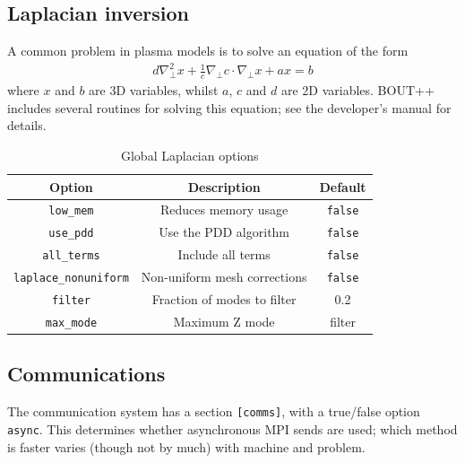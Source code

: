\documentclass[12pt]{article}
\newcommand{\code}[1]{\texttt{#1}}
\begin{document}
\subsection{Laplacian inversion}
\label{sec:laplacian}
%
%
A common problem in plasma models is to solve an equation of the form
%
\begin{align}
d\nabla^2_\perp x + \frac{1}{c}\nabla_\perp c\cdot\nabla_\perp x + a x = b
\end{align}
%
where $x$ and $b$ are 3D variables, whilst $a$, $c$ and $d$ are 2D variables.
BOUT++ includes several routines for solving this equation; see the developer's
manual for details.

%
\begin{table}[htbp!]
\caption{Global Laplacian options}
%
\label{tab:lapopts}
%
\centering
%
\begin{tabular}[c]{c c c}
\hline
Option & Description & Default \\
\hline
\texttt{low\_mem} & Reduces memory usage & \texttt{false} \\
\texttt{use\_pdd} & Use the PDD algorithm & \texttt{false} \\
\texttt{all\_terms} & Include all terms & \texttt{false} \\
\texttt{laplace\_nonuniform} & Non-uniform mesh corrections & \texttt{false} \\
\texttt{filter} & Fraction of modes to filter & 0.2 \\
\texttt{max\_mode} & Maximum Z mode & filter \\
\hline
\end{tabular}
%
\end{table}
%



\subsection{Communications}
%
%
The communication system has a section \code{[comms]}, with a true/false option
\code{async}. This determines whether asynchronous MPI sends are used; which
method is faster varies (though not by much) with machine and problem.
\end{document}
